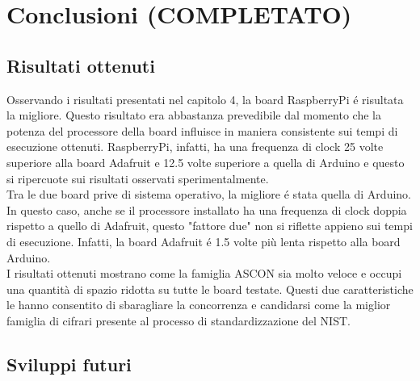 \chapter{Conclusioni (COMPLETATO)}

\section{Risultati ottenuti}

Osservando i risultati presentati nel capitolo 4, la board RaspberryPi é risultata la migliore. Questo risultato era abbastanza prevedibile dal momento che la potenza del processore della board influisce in maniera consistente sui tempi di esecuzione ottenuti. RaspberryPi, infatti, ha una frequenza di clock 25 volte superiore alla board Adafruit e 12.5 volte superiore a quella di Arduino e questo si ripercuote sui risultati osservati sperimentalmente. \\

\noindent Tra le due board prive di sistema operativo, la migliore é stata quella di Arduino. In questo caso, anche se il processore installato ha una frequenza di clock doppia rispetto a quello di Adafruit, questo "fattore due" non si riflette appieno sui tempi di esecuzione. Infatti, la board Adafruit é 1.5 volte più lenta rispetto alla board Arduino. \\

\noindent I risultati ottenuti mostrano come la famiglia ASCON sia molto veloce e occupi una quantità di spazio ridotta su tutte le board testate. Questi due caratteristiche le hanno consentito di sbaragliare la concorrenza e candidarsi come la miglior famiglia di cifrari presente al processo di standardizzazione del NIST.

\section{Sviluppi futuri}

